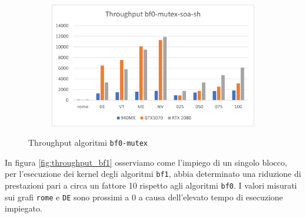 \documentclass[12pt,a4paper,oneside]{book}
\begin{document}
\begin{figure}[b]
\begin{subfigure}{.5\textwidth}
		\end{subfigure}%
		\begin{subfigure}{.5\textwidth}
			\centering
			\includegraphics[width=\textwidth]{throughput_bf0-mutex-soa-sh}
		\end{subfigure}
		\caption{Throughput algoritmi \texttt{bf0-mutex}}
		\label{fig:throughput_bf0-mutex}
	\end{figure}

	In figura \ref{fig:throughput_bf1} osserviamo come l'impiego di un singolo blocco, per l'esecuzione dei kernel degli algoritmi \texttt{bf1}, abbia determinato una riduzione di prestazioni pari a circa un fattore 10 rispetto agli algoritmi \texttt{bf0}. I valori misurati sui grafi \texttt{rome} e \texttt{DE} sono prossimi a $0$ a causa dell'elevato tempo di esecuzione impiegato.
\end{document}
